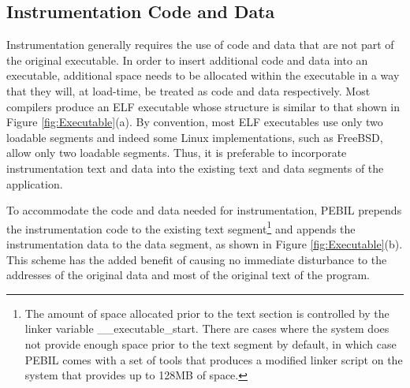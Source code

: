 \subsection{Instrumentation Code and Data}

Instrumentation generally requires the use of code and data that are not part of
the original executable. In order to insert additional code and data into an
executable, additional space needs to be allocated within the executable in a
way that they will, at load-time, be treated as code and data respectively. Most
compilers produce an ELF executable whose structure is similar to that shown in
Figure \ref{fig:Executable}(a). By convention, most ELF executables use only two
loadable segments and indeed some Linux implementations, such as FreeBSD, allow only
two loadable segments. Thus, it is preferable to incorporate
instrumentation text and data into the existing text and data segments of the
application. 

To accommodate the code and data needed for instrumentation, PEBIL prepends the
instrumentation code to the existing text segment\footnote{The amount of space
allocated prior to the text section is controlled by the linker variable
\_\_executable\_start. There are cases where the system does not provide enough
space prior to the text segment by default, in which case PEBIL comes with a set
of tools that produces a modified linker script on the system that provides up
to 128MB of space.} and appends the instrumentation data to the data segment, as
shown in Figure \ref{fig:Executable}(b). This scheme has the added benefit of
causing no immediate disturbance to the addresses of the original data and most
of the original text of the program.

